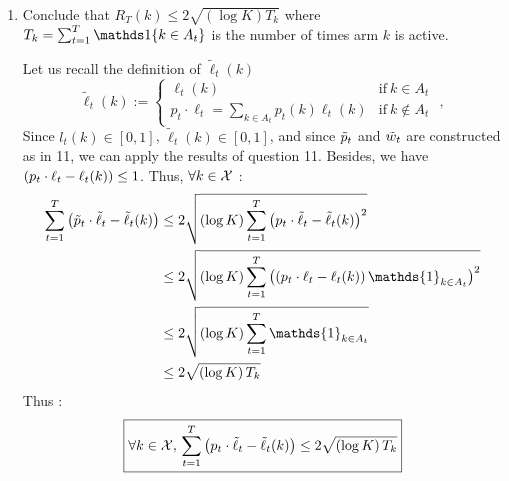 \begin{enumerate}[resume]
\begin{enumerate}[label=(\alph*)]
		
		\item Conclude that $R_T(k) \leq 2 \sqrt{(\log K)T_k}$ where $T_k = \sum_{t=1}^T \indic\{k\in A_t\}$ is the number of times arm $k$ is active.
		
		\begin{solution}
	Let us recall the definition of  $\tilde \ell_t(k)$	\begin{equation*}
		\tilde \ell_t(k) := \left\{ \begin{array}{ll} \ell_t(k) & \text{if} \ k \in A_t \\ p_t \cdot \ell_t = \sum_{k \in A_t} p_t(k) \ell_t(k) & \text{if} \ k \notin A_t \end{array} \right.\,\,,
	\end{equation*}
Since $l_t(k) \in [0,1]$,  $\tilde \ell_t(k) \in [0,1]$, and since $\Tilde{p}_t$ and $\Tilde{w}_t$ are constructed as in 11, we can apply the results of question 11. Besides, we have $\left( p_t \cdot \ell_t - \ell_t(k) \right) \leq 1$. Thus, $ \forall k \in \mathcal{X} $ :
\begin{equation*}
    \begin{aligned}
    \sum_{t=1}^T \br{\tilde{p}_t \cdot \tilde{\ell}_t - \tilde{\ell}_t(k)} &\leq 2 \sqrt{\br{\log K} \sum_{t=1}^T \br{p_t \cdot \tilde{\ell}_t - \tilde{\ell}_t(k)}^2}\\
    & \leq 2 \sqrt{\br{\log K} \sum_{t=1}^T \br{\br{p_t \cdot \ell_t - \ell_t(k)}\mathds{1}_{k \in A_t}}^2} \\
    & \leq 2 \sqrt{\br{\log K} \sum_{t=1}^T \mathds{1}_{k \in A_t}}\\
    & \leq 2 \sqrt{\br{\log K}T_k}
    \end{aligned}
\end{equation*}
Thus : 
 \begin{equation*}
                    \boxed{\forall k \in \mathcal{X},\, \sum_{t=1}^T \left( p_t \cdot \tilde{\ell}_t - \tilde{\ell}_t(k) \right) \leq 2 \sqrt{\left( \log K \right)T_k}}
                \end{equation*}


		\end{solution}
		
	\end{enumerate}
\end{enumerate}